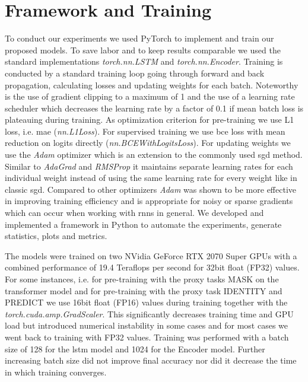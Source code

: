 
\section{Framework and Training} \label{sec:methodology:freamework_and_training}

To conduct our experiments we used PyTorch \cite{pytorch} to implement and train our proposed models. To save labor and to keep results comparable we used the standard implementations \textit{torch.nn.LSTM} and \textit{torch.nn.Encoder}. Training is conducted by a standard training loop going through forward and back propagation, calculating losses and updating weights for each batch. Noteworthy is the use of gradient clipping to a maximum of 1 and the use of a learning rate scheduler which decreases the learning rate by a factor of 0.1 if mean batch loss is plateauing during training. As optimization criterion for pre-training we use L1 loss, i.e. \gls{mae} (\textit{nn.L1Loss}). For supervised training we use \gls{bce} loss with mean reduction on logits directly (\textit{nn.BCEWithLogitsLoss}).
For updating weights we use the \textit{Adam} optimizer \cite{adam} which is an extension to the commonly used \gls{sgd} method. Similar to \textit{AdaGrad} \cite{optimizer_comparison} and \textit{RMSProp} \cite{optimizer_comparison} it maintains separate learning rates for each individual weight instead of using the same learning rate for every weight like in classic \gls{sgd}. Compared to other optimizers \textit{Adam} was shown to be more effective in improving training efficiency \cite{adam} and is appropriate for noisy or sparse gradients which can occur when working with \glspl{rnn} in general.
We developed and implemented a framework in Python to automate the experiments, generate statistics, plots and metrics. \par
The models were trained on two NVidia GeForce RTX 2070 Super GPUs with a combined performance of 19.4 Teraflops per second for 32bit float (FP32) values. For some instances, i.e. for pre-training with the proxy tasks MASK on the transformer model and for pre-training with the proxy task IDENTITY and PREDICT we use 16bit float (FP16) values during training together with the \textit{torch.cuda.amp.GradScaler}. This significantly decreases training time and GPU load but introduced numerical instability in some cases and for most cases we went back to training with FP32 values. Training was performed with a batch size of 128 for the \gls{lstm} model and 1024 for the Encoder model. Further increasing batch size did not improve final accuracy nor did it decrease the time in which training converges. \par

